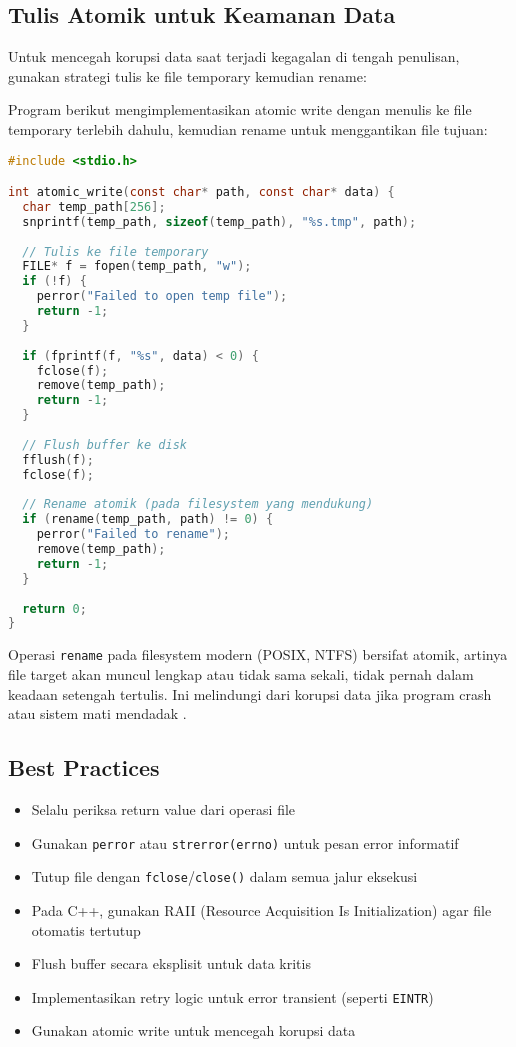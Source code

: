 \documentclass[../main.tex]{subfiles}
\begin{document}
\subsection{Tulis Atomik untuk Keamanan Data}

Untuk mencegah korupsi data saat terjadi kegagalan di tengah penulisan, gunakan strategi tulis ke file temporary kemudian rename:

Program berikut mengimplementasikan atomic write dengan menulis ke file temporary terlebih dahulu, kemudian rename untuk menggantikan file tujuan:

\begin{lstlisting}[language=C, caption={Menulis ke file sementara lalu rename (C, POSIX)}]
#include <stdio.h>

int atomic_write(const char* path, const char* data) {
  char temp_path[256];
  snprintf(temp_path, sizeof(temp_path), "%s.tmp", path);
  
  // Tulis ke file temporary
  FILE* f = fopen(temp_path, "w");
  if (!f) {
    perror("Failed to open temp file");
    return -1;
  }
  
  if (fprintf(f, "%s", data) < 0) {
    fclose(f);
    remove(temp_path);
    return -1;
  }
  
  // Flush buffer ke disk
  fflush(f);
  fclose(f);
  
  // Rename atomik (pada filesystem yang mendukung)
  if (rename(temp_path, path) != 0) {
    perror("Failed to rename");
    remove(temp_path);
    return -1;
  }
  
  return 0;
}
\end{lstlisting}

Operasi \texttt{rename} pada filesystem modern (POSIX, NTFS) bersifat atomik, artinya file target akan muncul lengkap atau tidak sama sekali, tidak pernah dalam keadaan setengah tertulis. Ini melindungi dari korupsi data jika program crash atau sistem mati mendadak \parencite{gnu-c-manual}.

\subsection{Best Practices}
\begin{itemize}
  \item Selalu periksa return value dari operasi file
  \item Gunakan \texttt{perror} atau \texttt{strerror(errno)} untuk pesan error informatif
  \item Tutup file dengan \texttt{fclose}/\texttt{close()} dalam semua jalur eksekusi
  \item Pada C++, gunakan RAII (Resource Acquisition Is Initialization) agar file otomatis tertutup
  \item Flush buffer secara eksplisit untuk data kritis
  \item Implementasikan retry logic untuk error transient (seperti \texttt{EINTR})
  \item Gunakan atomic write untuk mencegah korupsi data
\end{itemize}
\end{document}
